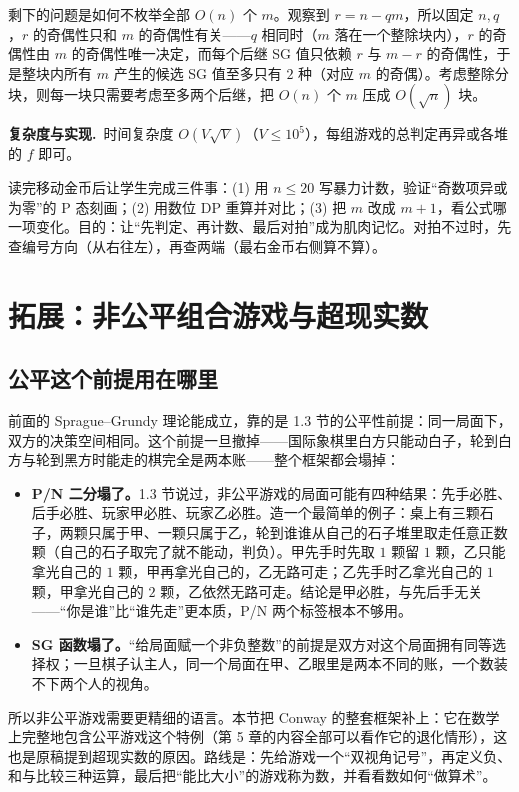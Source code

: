 \documentclass[UTF8,a4paper,11pt,oneside,openany,fontset=fandol]{ctexbook}
\theoremstyle{definition}
\newcommand{\cost}{\par\noindent\textbf{复杂度与实现.}\ }
\begin{document}
剩下的问题是如何不枚举全部 $O(n)$ 个 $m$。观察到 $r=n-qm$，所以固定 $n,q$，$r$ 的奇偶性只和 $m$ 的奇偶性有关——$q$ 相同时（$m$ 落在一个整除块内），$r$ 的奇偶性由 $m$ 的奇偶性唯一决定，而每个后继 SG 值只依赖 $r$ 与 $m-r$ 的奇偶性，于是整块内所有 $m$ 产生的候选 SG 值至多只有 $2$ 种（对应 $m$ 的奇偶）。考虑整除分块，则每一块只需要考虑至多两个后继，把 $O(n)$ 个 $m$ 压成 $O(\sqrt n)$ 块。

\cost 时间复杂度 $O(V\sqrt V)$（$V\le10^{5}$），每组游戏的总判定再异或各堆的 $f$ 即可。

\begin{teach}[给学生的实验任务]
读完移动金币后让学生完成三件事：(1) 用 $n\le20$ 写暴力计数，验证“奇数项异或为零”的 P 态刻画；(2) 用数位 DP 重算并对比；(3) 把 $m$ 改成 $m+1$，看公式哪一项变化。目的：让“先判定、再计数、最后对拍”成为肌肉记忆。对拍不过时，先查编号方向（从右往左），再查两端（最右金币右侧算不算）。
\end{teach}
\chapter{拓展：非公平组合游戏与超现实数}
\section{公平这个前提用在哪里}
前面的 Sprague--Grundy 理论能成立，靠的是 1.3 节的公平性前提：同一局面下，双方的决策空间相同。这个前提一旦撤掉——国际象棋里白方只能动白子，轮到白方与轮到黑方时能走的棋完全是两本账——整个框架都会塌掉：
\begin{itemize}
\item \textbf{P/N 二分塌了。}1.3 节说过，非公平游戏的局面可能有四种结果：先手必胜、后手必胜、玩家甲必胜、玩家乙必胜。造一个最简单的例子：桌上有三颗石子，两颗只属于甲、一颗只属于乙，轮到谁谁从自己的石子堆里取走任意正数颗（自己的石子取完了就不能动，判负）。甲先手时先取 $1$ 颗留 $1$ 颗，乙只能拿光自己的 $1$ 颗，甲再拿光自己的，乙无路可走；乙先手时乙拿光自己的 $1$ 颗，甲拿光自己的 $2$ 颗，乙依然无路可走。结论是甲必胜，与先后手无关——“你是谁”比“谁先走”更本质，P/N 两个标签根本不够用。
\item \textbf{SG 函数塌了。}“给局面赋一个非负整数”的前提是双方对这个局面拥有同等选择权；一旦棋子认主人，同一个局面在甲、乙眼里是两本不同的账，一个数装不下两个人的视角。
\end{itemize}
所以非公平游戏需要更精细的语言。本节把 Conway 的整套框架补上：它在数学上完整地包含公平游戏这个特例（第 5 章的内容全部可以看作它的退化情形），这也是原稿提到超现实数的原因。路线是：先给游戏一个“双视角记号”，再定义负、和与比较三种运算，最后把“能比大小”的游戏称为数，并看看数如何“做算术”。
\end{document}
